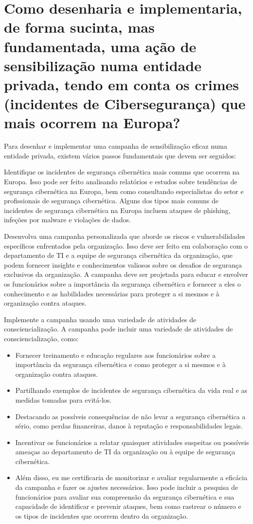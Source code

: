 \section[Pergunta 5]{Como desenharia e implementaria, de forma sucinta, mas fundamentada, uma ação de sensibilização numa entidade privada, tendo em conta os crimes (incidentes de Cibersegurança) que mais ocorrem na Europa?}

Para desenhar e implementar uma campanha de sensibilização eficaz numa entidade privada, existem vários passos fundamentais que devem ser seguidos:

Identifique os incidentes de segurança cibernética mais comuns que ocorrem na Europa. Isso pode ser feito analisando relatórios e estudos sobre tendências de segurança cibernética na Europa, bem como consultando especialistas do setor e profissionais de segurança cibernética. Alguns dos tipos mais comuns de incidentes de segurança cibernética na Europa incluem ataques de phishing, infeções por malware e violações de dados.

Desenvolva uma campanha personalizada que aborde os riscos e vulnerabilidades específicos enfrentados pela organização. Isso deve ser feito em colaboração com o departamento de TI e a equipe de segurança cibernética da organização, que podem fornecer insights e conhecimentos valiosos sobre os desafios de segurança exclusivos da organização. A campanha deve ser projetada para educar e envolver os funcionários sobre a importância da segurança cibernética e fornecer a eles o conhecimento e as habilidades necessárias para proteger a si mesmos e à organização contra ataques.

Implemente a campanha usando uma variedade de atividades de consciencialização. A campanha pode incluir uma variedade de atividades de consciencialização, como:

\begin{itemize}
  \item Fornecer treinamento e educação regulares aos funcionários sobre a importância da segurança cibernética e como proteger a si mesmos e à organização contra ataques.
  \item Partilhando exemplos de incidentes de segurança cibernética da vida real e as medidas tomadas para evitá-los.
  \item Destacando as possíveis consequências de não levar a segurança cibernética a sério, como perdas financeiras, danos à reputação e responsabilidades legais.
  \item Incentivar os funcionários a relatar quaisquer atividades suspeitas ou possíveis ameaças ao departamento de TI da organização ou à equipe de segurança cibernética.
  \item Além disso, eu me certificaria de monitorizar e avaliar regularmente a eficácia da campanha e fazer os ajustes necessários. Isso pode incluir a pesquisa de funcionários para avaliar sua compreensão da segurança cibernética e sua capacidade de identificar e prevenir ataques, bem como rastrear o número e os tipos de incidentes que ocorrem dentro da organização.
\end{itemize}

